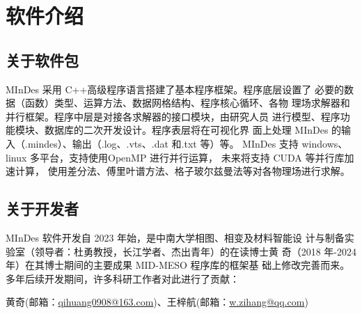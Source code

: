 \chapter{软件介绍}\label{chap:basics}
\section{关于软件包}
MInDes 采用 C++高级程序语言搭建了基本程序框架。程序底层设置了
必要的数据（函数）类型、运算方法、数据网格结构、程序核心循环、各物
理场求解器和并行框架。程序中层是对接各求解器的接口模块，由研究人员
进行模型、程序功能模块、数据库的二次开发设计。程序表层将在可视化界
面上处理 MInDes 的输入（.mindes）、输出（.log、.vts、.dat 和.txt 等）等。
MInDes 支持 windows、linux 多平台，支持使用OpenMP 进行并行运算，
未来将支持 CUDA 等并行库加速计算，
使用差分法、傅里叶谱方法、格子玻尔兹曼法等对各物理场进行求解。
\section{关于开发者}
MInDes 软件开发自 2023 年始，是中南大学相图、相变及材料智能设
计与制备实验室（领导者：杜勇教授，长江学者、杰出青年）的在读博士黄
奇（2018 年-2024 年）在其博士期间的主要成果 MID-MESO 程序库的框架基
础上修改完善而来。多年后续开发期间，许多科研工作者对此进行了贡献：

黄奇(邮箱：\href{mailto:qihuang0908@163.com}{qihuang0908@163.com})、王梓航(邮箱：\href{mailto:w.zihang@qq.com}{w.zihang@qq.com})
\endinput
